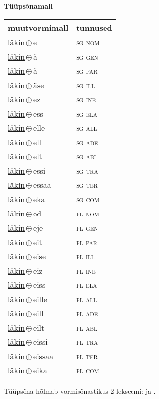 

\vspace{3.5em}
\noindent \begin{minipage}{\textwidth}
\noindent \textbf{Tüüpsõnamall \,}\\

\begin{sideways}
\begin{tabular}{l l}
muutvormimall & tunnused \\
\hline
\underline{läkin}\,$\oplus$\,e & \textsc{ sg nom } \\
\underline{läkin}\,$\oplus$\,ä & \textsc{ sg gen } \\
\underline{läkin}\,$\oplus$\,ä & \textsc{ sg par } \\
\underline{läkin}\,$\oplus$\,äse & \textsc{ sg ill } \\
\underline{läkin}\,$\oplus$\,ez & \textsc{ sg ine } \\
\underline{läkin}\,$\oplus$\,ess & \textsc{ sg ela } \\
\underline{läkin}\,$\oplus$\,elle & \textsc{ sg all } \\
\underline{läkin}\,$\oplus$\,ell & \textsc{ sg ade } \\
\underline{läkin}\,$\oplus$\,elt & \textsc{ sg abl } \\
\underline{läkin}\,$\oplus$\,essi & \textsc{ sg tra } \\
\underline{läkin}\,$\oplus$\,essaa & \textsc{ sg ter } \\
\underline{läkin}\,$\oplus$\,eka & \textsc{ sg com } \\
\underline{läkin}\,$\oplus$\,ed & \textsc{ pl nom } \\
\underline{läkin}\,$\oplus$\,eje & \textsc{ pl gen } \\
\underline{läkin}\,$\oplus$\,eit & \textsc{ pl par } \\
\underline{läkin}\,$\oplus$\,eise & \textsc{ pl ill } \\
\underline{läkin}\,$\oplus$\,eiz & \textsc{ pl ine } \\
\underline{läkin}\,$\oplus$\,eiss & \textsc{ pl ela } \\
\underline{läkin}\,$\oplus$\,eille & \textsc{ pl all } \\
\underline{läkin}\,$\oplus$\,eill & \textsc{ pl ade } \\
\underline{läkin}\,$\oplus$\,eilt & \textsc{ pl abl } \\
\underline{läkin}\,$\oplus$\,eissi & \textsc{ pl tra } \\
\underline{läkin}\,$\oplus$\,eissaa & \textsc{ pl ter } \\
\underline{läkin}\,$\oplus$\,eika & \textsc{ pl com } \\
\end{tabular}
\end{sideways}
\label{tab:tüüpsõnamall-läkine}

\end{minipage}

 
\vspace{1em}
\noindent Tüüpsõna hõlmab vormisõnastikus 2 lekseemi:  ja .
